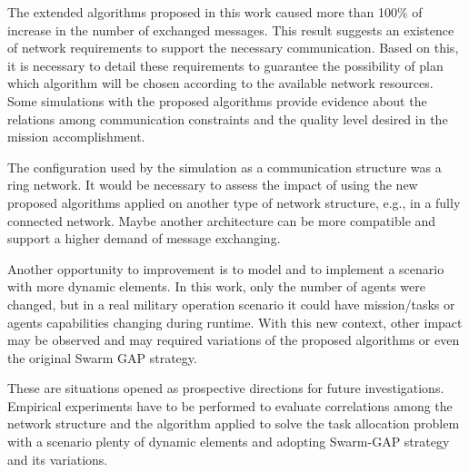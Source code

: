 The extended algorithms proposed in this work caused more than 100\% of increase in the number of exchanged messages. This result suggests an existence of network requirements to support the necessary communication. Based on this, it is necessary to detail these requirements to guarantee the possibility of plan which algorithm will be chosen according to the available network resources. Some simulations with the proposed algorithms provide evidence about the relations among communication constraints and the quality level desired in the mission accomplishment.

The configuration used by the simulation as a communication structure was a ring network. It would be necessary to assess the impact of using the new proposed algorithms applied on another type of network structure, e.g., in a fully connected network. Maybe another architecture can be more compatible and support a higher demand of message exchanging.

Another opportunity to improvement is to model and to implement a scenario with more dynamic elements. In this work, only the number of agents were changed, but in a real military operation scenario it could have mission/tasks or agents capabilities changing during runtime. With this new context, other impact may be observed and may required variations of the proposed algorithms or even the original Swarm GAP strategy.

These are situations opened as prospective directions for future investigations. Empirical experiments have to be performed to evaluate correlations among the network structure and the algorithm applied to solve the task allocation problem with a scenario plenty of dynamic elements and adopting Swarm-GAP strategy and its variations.
